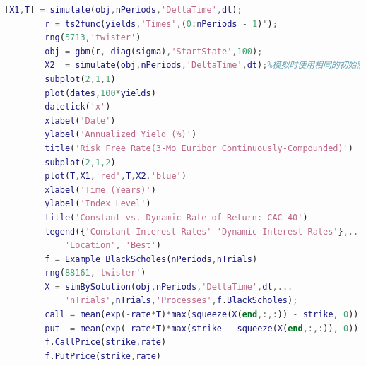 \begin{lstlisting}[language= Matlab]
        [X1,T] = simulate(obj,nPeriods,'DeltaTime',dt);
        r = ts2func(yields,'Times',(0:nPeriods - 1)');
        rng(5713,'twister')
        obj = gbm(r, diag(sigma),'StartState',100);
        X2  = simulate(obj,nPeriods,'DeltaTime',dt);%模拟时使用相同的初始随机数
        subplot(2,1,1)
        plot(dates,100*yields)
        datetick('x')
        xlabel('Date')
        ylabel('Annualized Yield (%)')
        title('Risk Free Rate(3-Mo Euribor Continuously-Compounded)')
        subplot(2,1,2)
        plot(T,X1,'red',T,X2,'blue')
        xlabel('Time (Years)')
        ylabel('Index Level')
        title('Constant vs. Dynamic Rate of Return: CAC 40')
        legend({'Constant Interest Rates' 'Dynamic Interest Rates'},...
            'Location', 'Best')
        f = Example_BlackScholes(nPeriods,nTrials)
        rng(88161,'twister')
        X = simBySolution(obj,nPeriods,'DeltaTime',dt,...
            'nTrials',nTrials,'Processes',f.BlackScholes);
        call = mean(exp(-rate*T)*max(squeeze(X(end,:,:)) - strike, 0))
        put  = mean(exp(-rate*T)*max(strike - squeeze(X(end,:,:)), 0))
        f.CallPrice(strike,rate)
        f.PutPrice(strike,rate)
        \end{lstlisting}

